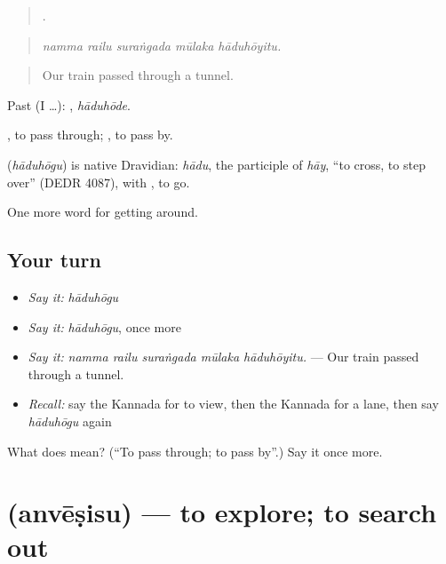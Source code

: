 \begin{quote}
    .
\end{quote}

\begin{quote}
\emph{namma railu suraṅgada mūlaka hāduhōyitu.}
\end{quote}

\begin{quote}
Our train passed through a tunnel.
\end{quote}

Past (I …): , \emph{hāduhōde}.

 , to pass through;  , to pass by.

\begin{cousinweb}
\textbf{} (\emph{hāduhōgu}) is native Dravidian: \emph{hādu}, the participle of \emph{hāy}, \textquotedblleft{}to cross, to step over\textquotedblright{} (DEDR 4087), with , to go.
\end{cousinweb}

\begin{grammarlens}[title={What you've built}]
One more word for getting around.
\end{grammarlens}

\subsection*{Your turn}
\begin{itemize}
\raggedright
  \item \emph{Say it:} \emph{hāduhōgu}
  \item \emph{Say it:} \emph{hāduhōgu}, once more
  \item \emph{Say it:} \emph{namma railu suraṅgada mūlaka hāduhōyitu.} — Our train passed through a tunnel.
  \item \emph{Recall:} say the Kannada for to view, then the Kannada for a lane, then say \emph{hāduhōgu} again
\end{itemize}

\begin{tcolorbox}[breakable,colback=teal!4,colframe=teal!35!black,title={Before you move on}]
What does  mean? (\textquotedblleft{}To pass through; to pass by\textquotedblright{}.) Say it once more.
\end{tcolorbox}
\section[\texorpdfstring{\kn{ಅನ್ವೇಷಿಸು} (anvēṣisu)}{ಅನ್ವೇಷಿಸು (anvēṣisu)}]{ (anvēṣisu) — to explore; to search out}

